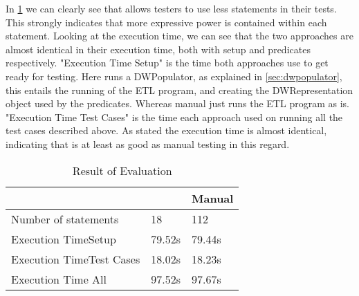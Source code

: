 In \cref{table:result} we can clearly see that \FW{} allows testers to use less statements in their tests. This strongly indicates that more expressive power is contained within each statement. Looking at the execution time, we can see that the two approaches are almost identical in their execution time, both with setup and predicates respectively. "Execution Time Setup" is the time both approaches use to get ready for testing. Here \FW{} runs a DWPopulator, as explained in \cref{sec:dwpopulator}, this entails the running of the ETL program, and creating the DWRepresentation object used by the predicates. Whereas manual just runs the ETL program as is. "Execution Time Test Cases" is the time each approach used on running all the test cases described above. As stated the execution time is almost identical, indicating that \FW{} is at least as good as manual testing in this regard.

\begin{table}[h]
\centering
\caption{Result of Evaluation}
\label{table:result}
\begin{tabular}{|p{}|p{}|p{}|}
\hline
																				& \FW{}	   & Manual	\\ \hline
Number of statements  									& 18 			 & 112 		\\ \hline
Execution Time\newline Setup						& 79.52s   & 79.44s  \\ \hline
Execution Time\newline Test Cases				& 18.02s   & 18.23s  \\ \hline
Execution Time All											& 97.52s   & 97.67s  \\ \hline

\end{tabular}
\end{table}







